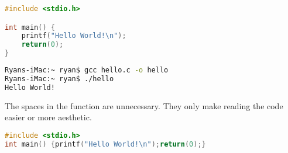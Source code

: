 \documentclass[crop=false,class=book]{standalone}
\begin{document}
\begin{minipage}[t]{.48\textwidth}
\centering
\begin{lstlisting}[language=C,basicstyle=\footnotesize\ttfamily,frame=single,caption=add.c]
#include <stdio.h>

int main() {
    printf("Hello World!\n");
    return(0);
}
\end{lstlisting}
\end{minipage}\hfill
\begin{minipage}[t]{.48\textwidth}
\centering
\begin{lstlisting}[language=bash,basicstyle=\footnotesize\ttfamily,frame=single,caption=output]
Ryans-iMac:~ ryan$ gcc hello.c -o hello
Ryans-iMac:~ ryan$ ./hello
Hello World!
\end{lstlisting}
\end{minipage}
The spaces in the function are unnecessary. They only make reading the code easier or more aesthetic.
\begin{lstlisting}[language=C,basicstyle=\footnotesize\ttfamily,frame=single,caption=add.c]
#include <stdio.h>
int main() {printf("Hello World!\n");return(0);}
\end{lstlisting}
\end{document}
